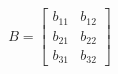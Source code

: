 \documentclass[preview]{standalone}
\begin{document}
\begin{align*}
B = \begin{bmatrix} b_{11} & b_{12} \\ b_{21} & b_{22} \\ b_{31} & b_{32} \end{bmatrix}
\end{align*}
\end{document}
